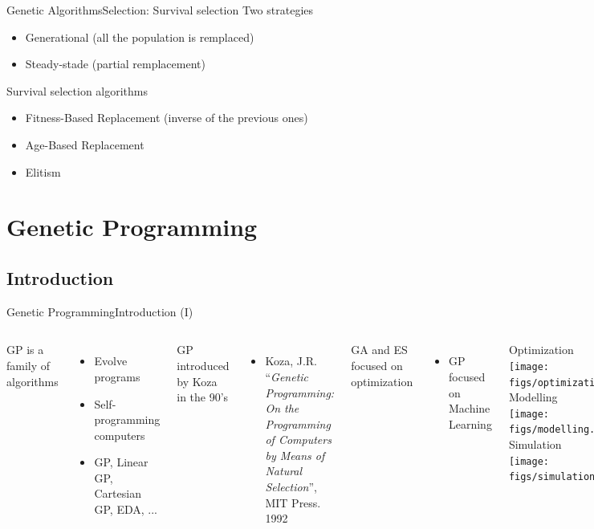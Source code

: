 \documentclass[10pt,compress]{beamer} %
\begin{document}
\begin{frame}{Genetic Algorithms}{Selection: Survival selection}
	Two strategies
	\begin{itemize}
		\item Generational (all the population is remplaced)
		\item Steady-stade (partial remplacement)
	\end{itemize}
	Survival selection algorithms
	\begin{itemize}
		\item Fitness-Based Replacement (inverse of the previous ones)
		\item Age-Based Replacement
		\item Elitism
  	\end{itemize}
\end{frame}

\section{Genetic Programming}
\subsection{Introduction}
\begin{frame}{Genetic Programming}{Introduction (I)}
    \begin{columns}
	GP is a family of algorithms
	\begin{itemize}
		\item Evolve programs
		\item Self-programming computers
		\item GP, Linear GP, Cartesian GP, EDA, ...
	\end{itemize}

	GP introduced by Koza in the 90's
	\begin{itemize}
		\item[] \small{Koza, J.R.  ``\textit{Genetic Programming: On the Programming of Computers by Means of Natural Selection}'', MIT Press. 1992}
	\end{itemize}

	GA and ES focused on optimization
	\begin{itemize}
		\item GP focused on Machine Learning
	\end{itemize}
	   \begin{center}
	   Optimization\\
	\texttt{[image: figs/optimization.eps]}\\\bigskip
		Modelling\\
	\texttt{[image: figs/modelling.eps]}\\\bigskip
		Simulation\\
	\texttt{[image: figs/simulation.eps]}\\
	\end{center}
	   \end{columns}
\end{frame}
\end{document}
